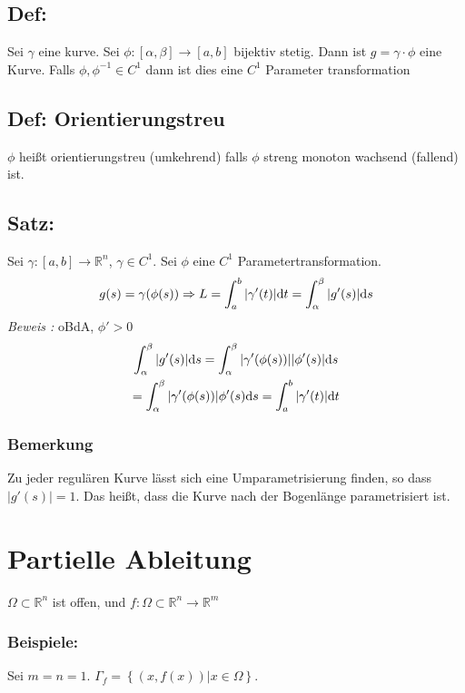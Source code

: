 \subsection{Def: }
Sei $\gamma$ eine kurve. Sei $\phi:[\alpha,\beta]\rightarrow[a,b]$ bijektiv stetig. Dann ist $g=\gamma\cdot\phi$ eine Kurve. Falls $\phi,\phi^{-1}\in C^1$ dann ist dies eine $C^1$ Parameter transformation

\subsection{Def: Orientierungstreu}
$\phi$ heißt orientierungstreu (umkehrend) falls $\phi$ streng monoton wachsend (fallend) ist.

\subsection{Satz: }
Sei $\gamma:[a,b]\rightarrow\mathbb R^n$, $\gamma\in C^1$. Sei $\phi$ eine $C^1$ Parametertransformation.
\begin{gather}
	g(s) = \gamma(\phi(s))\Rightarrow L = \int_a^b |\gamma'(t)|\text dt = \int_\alpha^\beta|g'(s)|\text ds
\end{gather}
\textit{Beweis :} oBdA, $\phi'>0$ 
\begin{gather}
	\int_\alpha^\beta |g'(s)|\text ds = \int_\alpha^\beta |\gamma'(\phi(s))||\phi'(s)|\text ds\\
	=\int_\alpha^\beta |\gamma'(\phi(s))|\phi'(s)\text ds = \int_a^b|\gamma'(t)|\text dt
\end{gather}

\subsubsection{Bemerkung}
Zu jeder regulären Kurve lässt sich eine Umparametrisierung finden, so dass $|g'(s)|=1$. Das heißt, dass die Kurve nach der Bogenlänge parametrisiert ist.

\section{Partielle Ableitung}
$\Omega\subset \mathbb R^n$ ist offen, und $f:\Omega\subset\mathbb R^n \rightarrow \mathbb R^m$

\subsubsection{Beispiele:}
Sei $m=n =1$. $\Gamma_f = \left\{(x,f(x))|x\in\Omega\right\}.$


